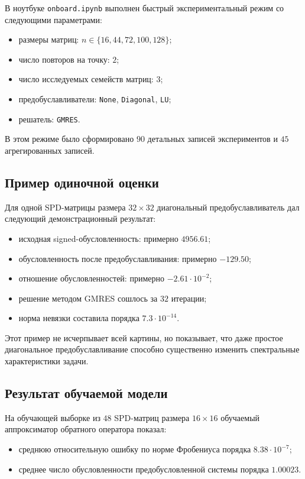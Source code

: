 \documentclass[12pt,a4paper]{article}
\begin{document}
В ноутбуке \texttt{onboard.ipynb} выполнен быстрый экспериментальный режим со следующими параметрами:
\begin{itemize}[leftmargin=*]
    \item размеры матриц: $n \in \{16, 44, 72, 100, 128\}$;
    \item число повторов на точку: $2$;
    \item число исследуемых семейств матриц: $3$;
    \item предобуславливатели: \texttt{None}, \texttt{Diagonal}, \texttt{LU};
    \item решатель: \texttt{GMRES}.
\end{itemize}

В этом режиме было сформировано $90$ детальных записей экспериментов и $45$ агрегированных записей.

\subsection{Пример одиночной оценки}

Для одной SPD-матрицы размера $32 \times 32$ диагональный предобуславливатель дал следующий демонстрационный результат:
\begin{itemize}[leftmargin=*]
    \item исходная signed-обусловленность: примерно $4956.61$;
    \item обусловленность после предобуславливания: примерно $-129.50$;
    \item отношение обусловленностей: примерно $-2.61 \cdot 10^{-2}$;
    \item решение методом GMRES сошлось за $32$ итерации;
    \item норма невязки составила порядка $7.3 \cdot 10^{-14}$.
\end{itemize}

Этот пример не исчерпывает всей картины, но показывает, что даже простое диагональное предобуславливание способно существенно изменить спектральные характеристики задачи.

\subsection{Результат обучаемой модели}

На обучающей выборке из $48$ SPD-матриц размера $16 \times 16$ обучаемый аппроксиматор обратного оператора показал:
\begin{itemize}[leftmargin=*]
    \item среднюю относительную ошибку по норме Фробениуса порядка $8.38 \cdot 10^{-7}$;
    \item среднее число обусловленности предобусловленной системы порядка $1.00023$.
\end{itemize}
\end{document}

